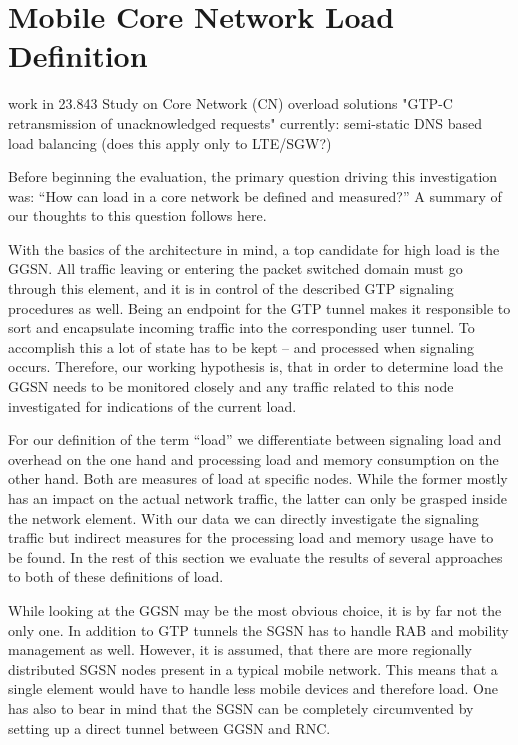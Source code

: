 


\section{Mobile Core Network Load Definition}
\label{c4:loaddefinition}

work in 23.843 \cite{3gpp.23.843} Study on Core Network (CN) overload solutions
"GTP-C retransmission of unacknowledged requests"
currently: semi-static DNS based load balancing (does this apply only to LTE/SGW?)


Before beginning the evaluation, the primary question driving this investigation was: ``How can load in a core network be defined and measured?'' A summary of our thoughts to this question follows here.

With the basics of the architecture in mind, a top candidate for high load is the \gls{GGSN}. All traffic leaving or entering the packet switched domain must go through this element, and it is in control of the described GTP signaling procedures as well. Being an endpoint for the GTP tunnel makes it responsible to sort and encapsulate incoming traffic into the corresponding user tunnel. To accomplish this a lot of state has to be kept -- and processed when signaling occurs. Therefore, our working hypothesis is, that in order to determine load the \gls{GGSN} needs to be monitored closely and any traffic related to this node investigated for indications of the current load.

For our definition of the term ``load'' we differentiate between signaling load and overhead on the one hand and processing load and memory consumption on the other hand. Both are measures of load at specific nodes. While the former mostly has an impact on the actual network traffic, the latter can only be grasped inside the network element. With our data we can directly investigate the signaling traffic but indirect measures for the processing load and memory usage have to be found. In the rest of this section we evaluate the results of several approaches to both of these definitions of load.

While looking at the \gls{GGSN} may be the most obvious choice, it is by far not the only one. 
In addition to GTP tunnels the \gls{SGSN} has to handle \gls{RAB} and mobility management as well. However, it is assumed, that there are more regionally distributed \gls{SGSN} nodes present in a typical mobile network. This means that a single element would have to handle less mobile devices and therefore load. One has also to bear in mind that the \gls{SGSN} can be completely circumvented by setting up a direct tunnel between \gls{GGSN} and \gls{RNC}.

